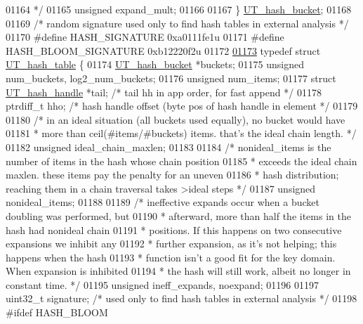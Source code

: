 \begin{DoxyCode}
{{{{{{{{{01164 \textcolor{comment}{    */}
01165    \textcolor{keywordtype}{unsigned} expand\_mult;
01166 
01167 \} \mbox{\hyperlink{structUT__hash__bucket}{UT\_hash\_bucket}};
01168 
01169 \textcolor{comment}{/* random signature used only to find hash tables in external analysis */}
01170 \textcolor{preprocessor}{#define HASH\_SIGNATURE 0xa0111fe1u}
01171 \textcolor{preprocessor}{#define HASH\_BLOOM\_SIGNATURE 0xb12220f2u}
01172 
\mbox{\hyperlink{structUT__hash__table}{01173}} \textcolor{keyword}{typedef} \textcolor{keyword}{struct }\mbox{\hyperlink{structUT__hash__table}{UT\_hash\_table}} \{
01174    \mbox{\hyperlink{structUT__hash__bucket}{UT\_hash\_bucket}} *buckets;
01175    \textcolor{keywordtype}{unsigned} num\_buckets, log2\_num\_buckets;
01176    \textcolor{keywordtype}{unsigned} num\_items;
01177    \textcolor{keyword}{struct }\mbox{\hyperlink{structUT__hash__handle}{UT\_hash\_handle}} *tail; \textcolor{comment}{/* tail hh in app order, for fast append    */}
01178    ptrdiff\_t hho; \textcolor{comment}{/* hash handle offset (byte pos of hash handle in element */}
01179 
01180    \textcolor{comment}{/* in an ideal situation (all buckets used equally), no bucket would have}
01181 \textcolor{comment}{    * more than ceil(#items/#buckets) items. that's the ideal chain length. */}
01182    \textcolor{keywordtype}{unsigned} ideal\_chain\_maxlen;
01183 
01184    \textcolor{comment}{/* nonideal\_items is the number of items in the hash whose chain position}
01185 \textcolor{comment}{    * exceeds the ideal chain maxlen. these items pay the penalty for an uneven}
01186 \textcolor{comment}{    * hash distribution; reaching them in a chain traversal takes >ideal steps */}
01187    \textcolor{keywordtype}{unsigned} nonideal\_items;
01188 
01189    \textcolor{comment}{/* ineffective expands occur when a bucket doubling was performed, but}
01190 \textcolor{comment}{    * afterward, more than half the items in the hash had nonideal chain}
01191 \textcolor{comment}{    * positions. If this happens on two consecutive expansions we inhibit any}
01192 \textcolor{comment}{    * further expansion, as it's not helping; this happens when the hash}
01193 \textcolor{comment}{    * function isn't a good fit for the key domain. When expansion is inhibited}
01194 \textcolor{comment}{    * the hash will still work, albeit no longer in constant time. */}
01195    \textcolor{keywordtype}{unsigned} ineff\_expands, noexpand;
01196 
01197    uint32\_t signature; \textcolor{comment}{/* used only to find hash tables in external analysis */}
01198 \textcolor{preprocessor}{#ifdef HASH\_BLOOM}
}}}}}}}}}
\end{DoxyCode}
